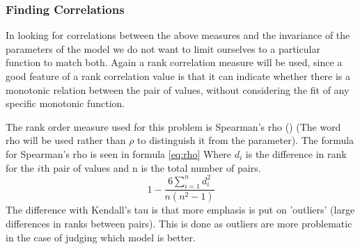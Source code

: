 \documentclass{scrartcl}
\newcommand\todo[1]{\textit{\textcolor{red}{#1}}}
\begin{document}
\subsubsection{Finding Correlations}
In looking for correlations between the above measures and the invariance of the parameters of the model we do not want to limit ourselves to a particular function to match both. Again a rank correlation measure will be used, since a good feature of a rank correlation value is that it can indicate whether there is a monotonic relation between the pair of values, without considering the fit of any specific monotonic function. 
 
The rank order measure used for this problem is Spearman's rho (\cite{rank}) (The word rho will be used rather than $\rho$ to distinguish it from the parameter). The formula for Spearman's rho is seen in formula \ref{eq:rho} Where $d_{i}$ is the difference in rank for the $i$th pair of values and n is the total number of pairs.
\begin{equation}
\label{eq:rho}
1-\frac{6 \sum\limits_{i=1}^n d_{i}^{2}}{n(n^{2}-1)} 
\end{equation}
The difference with Kendall's tau is that more emphasis is put on 'outliers' (large differences in ranks between pairs). This is done as outliers are more problematic in the case of judging which model is better.

\end{document}
